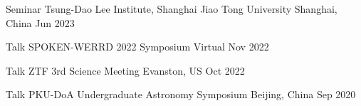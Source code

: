 \begin{cventries}
	\cvsimsimpentry
	{Seminar}
	{Tsung-Dao Lee Institute, Shanghai Jiao Tong University}
	{Shanghai, China}
	{Jun 2023}

	\cvsimsimpentry
	{Talk}
	{SPOKEN-WERRD 2022 Symposium} %
	{Virtual} %
	{Nov 2022} %

	\cvsimsimpentry
	{Talk} %
	{ZTF 3rd Science Meeting} %
	{Evanston, US} %
	{Oct 2022} %
	
	\cvsimsimpentry
	{Talk} %
	{PKU-DoA Undergraduate Astronomy Symposium} %
	{Beijing, China} %
	{Sep 2020} %

\end{cventries}